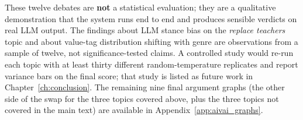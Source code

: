 These twelve debates are \textbf{not} a statistical evaluation; they are a qualitative demonstration that the system runs end to end and produces sensible verdicts on real LLM output. The findings about LLM stance bias on the \emph{replace teachers} topic and about value-tag distribution shifting with genre are observations from a sample of twelve, not significance-tested claims. A controlled study would re-run each topic with at least thirty different random-temperature replicates and report variance bars on the final score; that study is listed as future work in Chapter~\ref{ch:conclusion}. The remaining nine final argument graphs (the other side of the swap for the three topics covered above, plus the three topics not covered in the main text) are available in Appendix~\ref{app:aivai_graphs}.

%
%
%
%
